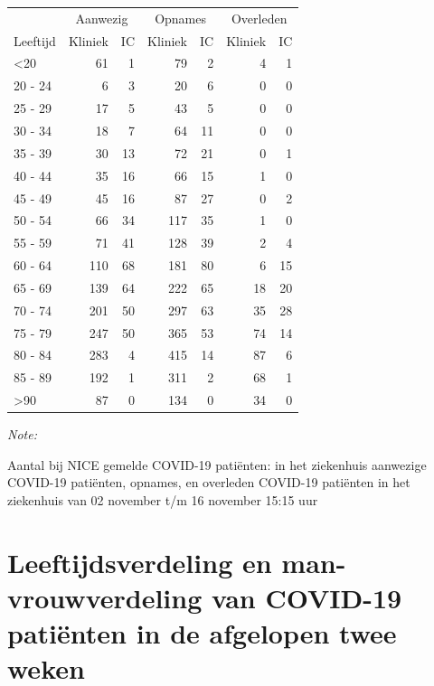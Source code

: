 \documentclass[
  english,
  man,floatsintext]{apa6}
\begin{document}
\begin{table}
\centering\begingroup\fontsize{10}{12}\selectfont

\begin{threeparttable}
\begin{tabular}{lrrrrrr}
\toprule
\multicolumn{1}{c}{ } & \multicolumn{2}{c}{Aanwezig} & \multicolumn{2}{c}{Opnames} & \multicolumn{2}{c}{Overleden} \\
\cmidrule(l{3pt}r{3pt}){2-3} \cmidrule(l{3pt}r{3pt}){4-5} \cmidrule(l{3pt}r{3pt}){6-7}
Leeftijd & Kliniek & IC & Kliniek & IC & Kliniek & IC\\
\midrule
<20 & 61 & 1 & 79 & 2 & 4 & 1\\
20 - 24 & 6 & 3 & 20 & 6 & 0 & 0\\
25 - 29 & 17 & 5 & 43 & 5 & 0 & 0\\
30 - 34 & 18 & 7 & 64 & 11 & 0 & 0\\
35 - 39 & 30 & 13 & 72 & 21 & 0 & 1\\
40 - 44 & 35 & 16 & 66 & 15 & 1 & 0\\
45 - 49 & 45 & 16 & 87 & 27 & 0 & 2\\
50 - 54 & 66 & 34 & 117 & 35 & 1 & 0\\
55 - 59 & 71 & 41 & 128 & 39 & 2 & 4\\
60 - 64 & 110 & 68 & 181 & 80 & 6 & 15\\
65 - 69 & 139 & 64 & 222 & 65 & 18 & 20\\
70 - 74 & 201 & 50 & 297 & 63 & 35 & 28\\
75 - 79 & 247 & 50 & 365 & 53 & 74 & 14\\
80 - 84 & 283 & 4 & 415 & 14 & 87 & 6\\
85 - 89 & 192 & 1 & 311 & 2 & 68 & 1\\
>90 & 87 & 0 & 134 & 0 & 34 & 0\\
\bottomrule
\end{tabular}
\begin{tablenotes}
\item \textit{Note: } 
\item Aantal bij NICE gemelde COVID-19 patiënten: in het ziekenhuis aanwezige COVID-19 patiënten, opnames, en overleden COVID-19 patiënten in het ziekenhuis van 02 november t/m 16 november 15:15 uur
\end{tablenotes}
\end{threeparttable}
\endgroup{}
\end{table}

\newpage

\hypertarget{leeftijdsverdeling-en-man-vrouwverdeling-van-covid-19-patiuxebnten-in-de-afgelopen-twee-weken}{%
\section{Leeftijdsverdeling en man-vrouwverdeling van COVID-19 patiënten in de afgelopen twee weken}\label{leeftijdsverdeling-en-man-vrouwverdeling-van-covid-19-patiuxebnten-in-de-afgelopen-twee-weken}}
\end{document}
